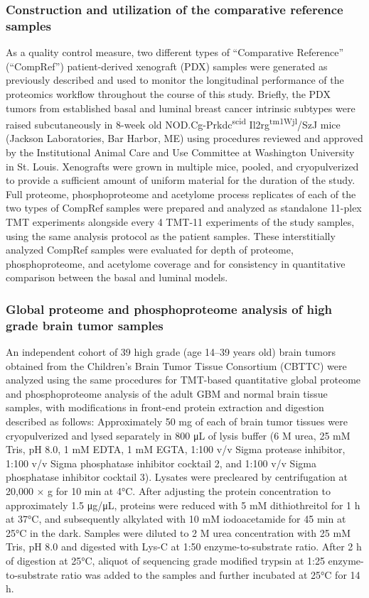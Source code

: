 \subsubsection{Construction and utilization of the comparative reference samples}
As a quality control measure, two different types of ``Comparative Reference'' (``CompRef'') patient-derived xenograft (PDX) samples were generated as previously described \cite{lis_ellismj:EndocrinetherapyresistantESR12013,tabbdl_lieblerdc:ReproducibilityDifferential2016} and used to monitor the longitudinal performance of the proteomics workflow throughout the course of this study. Briefly, the PDX tumors from established basal and luminal breast cancer intrinsic subtypes were raised subcutaneously in 8-week old NOD.Cg-Prkdc\textsuperscript{scid} Il2rg\textsuperscript{tm1Wjl}/SzJ mice (Jackson Laboratories, Bar Harbor, ME) using procedures reviewed and approved by the Institutional Animal Care and Use Committee at Washington University in St. Louis. Xenografts were grown in multiple mice, pooled, and cryopulverized to provide a sufficient amount of uniform material for the duration of the study. Full proteome, phosphoproteome and acetylome process replicates of each of the two types of CompRef samples were prepared and analyzed as standalone 11-plex TMT experiments alongside every 4 TMT-11 experiments of the study samples, using the same analysis protocol as the patient samples. These interstitially analyzed CompRef samples were evaluated for depth of proteome, phosphoproteome, and acetylome coverage and for consistency in quantitative comparison between the basal and luminal models.

\subsubsection{Global proteome and phosphoproteome analysis of high grade brain tumor samples}
An independent cohort of 39 high grade (age 14--39 years old) brain tumors obtained from the Children’s Brain Tumor Tissue Consortium (CBTTC) were analyzed using the same procedures for TMT-based quantitative global proteome and phosphoproteome analysis of the adult GBM and normal brain tissue samples, with modifications in front-end protein extraction and digestion described as follows: Approximately 50 mg of each of brain tumor tissues were cryopulverized and lysed separately in 800 μL of lysis buffer (6 M urea, 25 mM Tris, pH 8.0, 1 mM EDTA, 1 mM EGTA, 1:100 v/v Sigma protease inhibitor, 1:100 v/v Sigma phosphatase inhibitor cocktail 2, and 1:100 v/v Sigma phosphatase inhibitor cocktail 3). Lysates were precleared by centrifugation at 20,000 × g for 10 min at 4°C. After adjusting the protein concentration to approximately 1.5 μg/μL, proteins were reduced with 5 mM dithiothreitol for 1 h at 37°C, and subsequently alkylated with 10 mM iodoacetamide for 45 min at 25°C in the dark. Samples were diluted to 2 M urea concentration with 25 mM Tris, pH 8.0 and digested with Lys-C at 1:50 enzyme-to-substrate ratio. After 2 h of digestion at 25°C, aliquot of sequencing grade modified trypsin at 1:25 enzyme-to-substrate ratio was added to the samples and further incubated at 25°C for 14 h.


